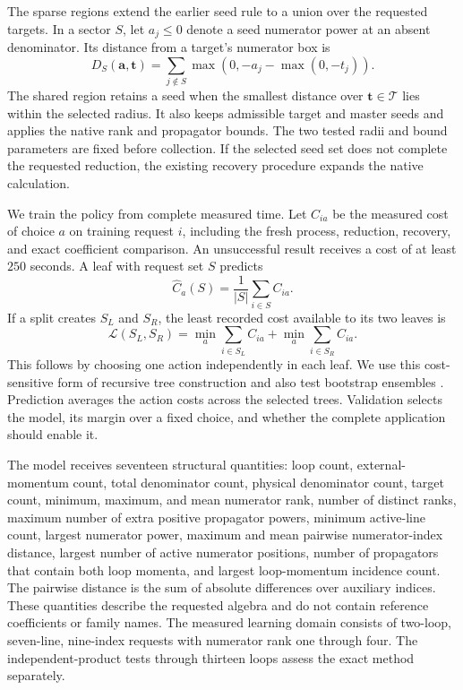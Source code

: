 The sparse regions extend the earlier seed rule to a union over the requested targets. In a sector \(S\), let \(a_j\le0\) denote a seed numerator power at an absent denominator. Its distance from a target's numerator box is
\begin{equation}
 D_S(\mathbf a,\mathbf t)
 =\sum_{j\notin S}\max\!\left(0,-a_j-\max(0,-t_j)\right).
 \label{eq:batch-seed-distance}
\end{equation}
The shared region retains a seed when the smallest distance over \(\mathbf t\in\mathcal T\) lies within the selected radius. It also keeps admissible target and master seeds and applies the native rank and propagator bounds. The two tested radii and bound parameters are fixed before collection. If the selected seed set does not complete the requested reduction, the existing recovery procedure expands the native calculation.

We train the policy from complete measured time. Let \(C_{ia}\) be the measured cost of choice \(a\) on training request \(i\), including the fresh process, reduction, recovery, and exact coefficient comparison. An unsuccessful result receives a cost of at least \(250\) seconds. A leaf with request set \(S\) predicts
\begin{equation}
 \widehat C_a(S)=\frac{1}{|S|}\sum_{i\in S}C_{ia}.
 \label{eq:batch-leaf-cost}
\end{equation}
If a split creates \(S_L\) and \(S_R\), the least recorded cost available to its two leaves is
\begin{equation}
 \mathcal L(S_L,S_R)=
 \min_a\sum_{i\in S_L}C_{ia}
 +\min_a\sum_{i\in S_R}C_{ia}.
 \label{eq:batch-tree-loss}
\end{equation}
This follows by choosing one action independently in each leaf. We use this cost-sensitive form of recursive tree construction and also test bootstrap ensembles \cite{CART1984,Breiman1996Bagging}. Prediction averages the action costs across the selected trees. Validation selects the model, its margin over a fixed choice, and whether the complete application should enable it.

The model receives seventeen structural quantities: loop count, external-momentum count, total denominator count, physical denominator count, target count, minimum, maximum, and mean numerator rank, number of distinct ranks, maximum number of extra positive propagator powers, minimum active-line count, largest numerator power, maximum and mean pairwise numerator-index distance, largest number of active numerator positions, number of propagators that contain both loop momenta, and largest loop-momentum incidence count. The pairwise distance is the sum of absolute differences over auxiliary indices. These quantities describe the requested algebra and do not contain reference coefficients or family names. The measured learning domain consists of two-loop, seven-line, nine-index requests with numerator rank one through four. The independent-product tests through thirteen loops assess the exact method separately.


